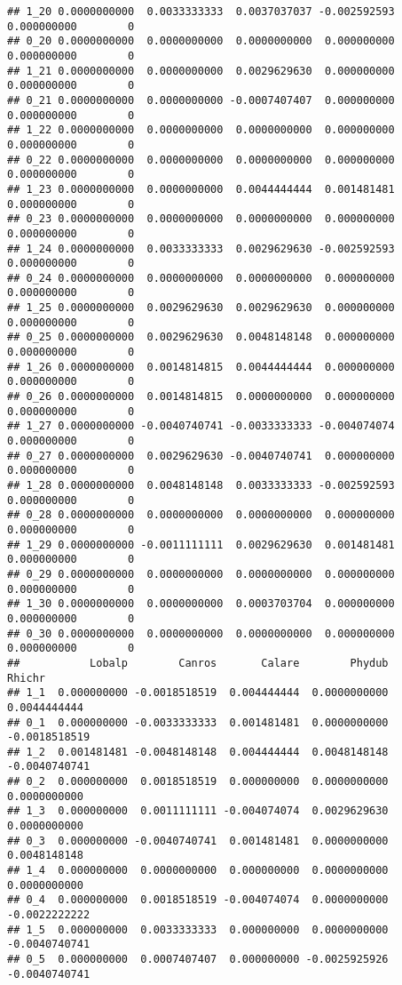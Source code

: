 \documentclass[]{article}
\begin{document}
\begin{verbatim}
## 1_20 0.0000000000  0.0033333333  0.0037037037 -0.002592593 0.000000000        0
## 0_20 0.0000000000  0.0000000000  0.0000000000  0.000000000 0.000000000        0
## 1_21 0.0000000000  0.0000000000  0.0029629630  0.000000000 0.000000000        0
## 0_21 0.0000000000  0.0000000000 -0.0007407407  0.000000000 0.000000000        0
## 1_22 0.0000000000  0.0000000000  0.0000000000  0.000000000 0.000000000        0
## 0_22 0.0000000000  0.0000000000  0.0000000000  0.000000000 0.000000000        0
## 1_23 0.0000000000  0.0000000000  0.0044444444  0.001481481 0.000000000        0
## 0_23 0.0000000000  0.0000000000  0.0000000000  0.000000000 0.000000000        0
## 1_24 0.0000000000  0.0033333333  0.0029629630 -0.002592593 0.000000000        0
## 0_24 0.0000000000  0.0000000000  0.0000000000  0.000000000 0.000000000        0
## 1_25 0.0000000000  0.0029629630  0.0029629630  0.000000000 0.000000000        0
## 0_25 0.0000000000  0.0029629630  0.0048148148  0.000000000 0.000000000        0
## 1_26 0.0000000000  0.0014814815  0.0044444444  0.000000000 0.000000000        0
## 0_26 0.0000000000  0.0014814815  0.0000000000  0.000000000 0.000000000        0
## 1_27 0.0000000000 -0.0040740741 -0.0033333333 -0.004074074 0.000000000        0
## 0_27 0.0000000000  0.0029629630 -0.0040740741  0.000000000 0.000000000        0
## 1_28 0.0000000000  0.0048148148  0.0033333333 -0.002592593 0.000000000        0
## 0_28 0.0000000000  0.0000000000  0.0000000000  0.000000000 0.000000000        0
## 1_29 0.0000000000 -0.0011111111  0.0029629630  0.001481481 0.000000000        0
## 0_29 0.0000000000  0.0000000000  0.0000000000  0.000000000 0.000000000        0
## 1_30 0.0000000000  0.0000000000  0.0003703704  0.000000000 0.000000000        0
## 0_30 0.0000000000  0.0000000000  0.0000000000  0.000000000 0.000000000        0
##           Lobalp        Canros       Calare        Phydub        Rhichr
## 1_1  0.000000000 -0.0018518519  0.004444444  0.0000000000  0.0044444444
## 0_1  0.000000000 -0.0033333333  0.001481481  0.0000000000 -0.0018518519
## 1_2  0.001481481 -0.0048148148  0.004444444  0.0048148148 -0.0040740741
## 0_2  0.000000000  0.0018518519  0.000000000  0.0000000000  0.0000000000
## 1_3  0.000000000  0.0011111111 -0.004074074  0.0029629630  0.0000000000
## 0_3  0.000000000 -0.0040740741  0.001481481  0.0000000000  0.0048148148
## 1_4  0.000000000  0.0000000000  0.000000000  0.0000000000  0.0000000000
## 0_4  0.000000000  0.0018518519 -0.004074074  0.0000000000 -0.0022222222
## 1_5  0.000000000  0.0033333333  0.000000000  0.0000000000 -0.0040740741
## 0_5  0.000000000  0.0007407407  0.000000000 -0.0025925926 -0.0040740741

\end{verbatim}
\end{document}
